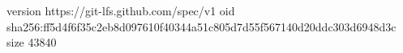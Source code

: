 version https://git-lfs.github.com/spec/v1
oid sha256:ff5d4f6f35c2eb8d097610f40344a51c805d7d55f567140d20ddc303d6948d3c
size 43840
